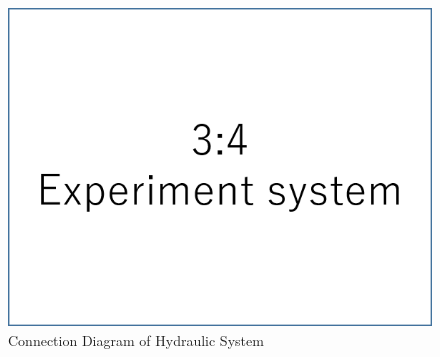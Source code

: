 \begin{figure}[t]
    \centering
        \includegraphics[keepaspectratio, scale=1.0]{contents/SystemIdentification/figure/3-4ExperimentSystem.png}
        \caption{Connection Diagram of Hydraulic System }
        \label{fig:ConnectionDiagram}
\end{figure}


